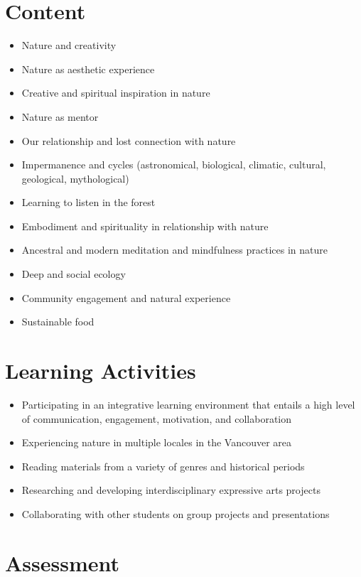 \documentclass[12pt, letterpaper]{article}
\begin{document}
\section{Content}

\begin{itemize}
\item
  Nature and creativity
\item
  Nature as aesthetic experience
\item
  Creative and spiritual inspiration in nature
\item
  Nature as mentor
\item
  Our relationship and lost connection with nature
\item
  Impermanence and cycles (astronomical, biological, climatic, cultural,
  geological, mythological)
\item
  Learning to listen in the forest
\item
  Embodiment and spirituality in relationship with nature
\item
  Ancestral and modern meditation and mindfulness practices in nature
\item
  Deep and social ecology
\item
  Community engagement and natural experience
\item
  Sustainable food
\end{itemize}

\section{Learning Activities}

\begin{itemize}
\item
  Participating in an integrative learning environment that entails a
  high level of communication, engagement, motivation, and collaboration
\item
  Experiencing nature in multiple locales in the Vancouver area
\item
  Reading materials from a variety of genres and historical periods
\item
  Researching and developing interdisciplinary expressive arts projects
\item
  Collaborating with other students on group projects and presentations
\end{itemize}

\section{Assessment}
\end{document}
